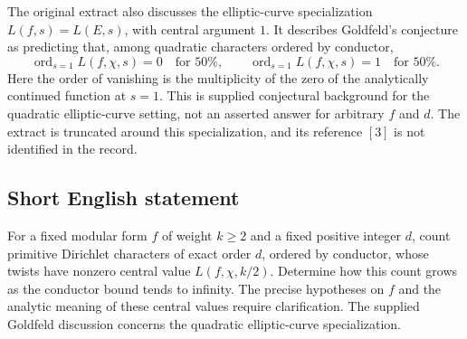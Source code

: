 \documentclass[11pt]{article}
\begin{document}
The original extract also discusses the elliptic-curve specialization \(L(f,s)=L(E,s)\), with central argument \(1\). It describes Goldfeld's conjecture as predicting that, among quadratic characters ordered by conductor,
\[
\operatorname{ord}_{s=1}L(f,\chi,s)=0\quad\text{for }50\%,\qquad
\operatorname{ord}_{s=1}L(f,\chi,s)=1\quad\text{for }50\%.
\]
Here the order of vanishing is the multiplicity of the zero of the analytically continued function at \(s=1\). This is supplied conjectural background for the quadratic elliptic-curve setting, not an asserted answer for arbitrary \(f\) and \(d\). The extract is truncated around this specialization, and its reference \([3]\) is not identified in the record.
\subsection{Short English statement}
For a fixed modular form \(f\) of weight \(k\geq 2\) and a fixed positive integer \(d\), count primitive Dirichlet characters of exact order \(d\), ordered by conductor, whose twists have nonzero central value \(L(f,\chi,k/2)\). Determine how this count grows as the conductor bound tends to infinity. The precise hypotheses on \(f\) and the analytic meaning of these central values require clarification. The supplied Goldfeld discussion concerns the quadratic elliptic-curve specialization.
\end{document}

